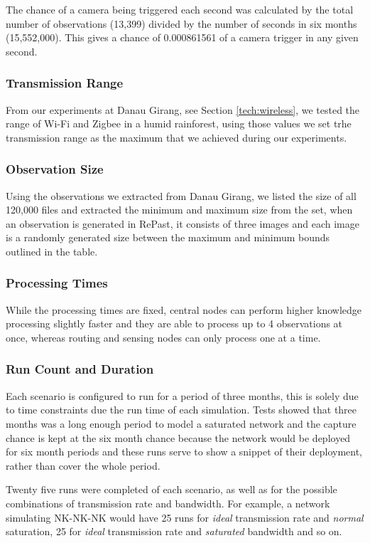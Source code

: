 	The chance of a camera being triggered each second was calculated by the total number of observations (13,399) divided by the number of seconds in six months (15,552,000). This gives a chance of 0.000861561 of a camera trigger in any given second.

	\subsubsection{Transmission Range}
	From our experiments at Danau Girang, see Section \ref{tech:wireless}, we tested the range of Wi-Fi and Zigbee in a humid rainforest, using those values we set trhe transmission range as the maximum that we achieved during our experiments.

	\subsubsection{Observation Size}
	Using the observations we extracted from Danau Girang, we listed the size of all 120,000 files and extracted the minimum and maximum size from the set, when an observation is generated in RePast, it consists of three images and each image is a randomly generated size between the maximum and minimum bounds outlined in the table.

	\subsubsection{Processing Times}
	While the processing times are fixed, central nodes can perform higher knowledge processing slightly faster and they are able to process up to 4 observations at once, whereas routing and sensing nodes can only process one at a time.
	
	\subsubsection{Run Count and Duration}
	Each scenario is configured to run for a period of three months, this is solely due to time constraints due the run time of each simulation. Tests showed that three months was a long enough period to model a saturated network and the capture chance is kept at the six month chance because the network would be deployed for six month periods and these runs serve to show a snippet of their deployment, rather than cover the whole period.
	
	Twenty five runs were completed of each scenario, as well as for the possible combinations of transmission rate and bandwidth. For example, a network simulating NK-NK-NK would have 25 runs for \textit{ideal} transmission rate and \textit{normal} saturation, 25 for \textit{ideal} transmission rate and \textit{saturated} bandwidth and so on.

